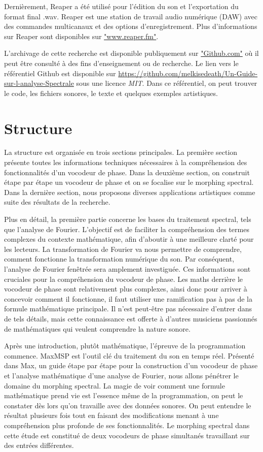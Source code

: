 Dernièrement, Reaper a été utilisé pour l'édition du son et l'exportation du format final .wav. Reaper est une station de travail audio numérique (DAW) avec des commandes multicanaux et des options d'enregistrement. Plus d’informations sur Reaper sont disponibles sur \href{https://www.reaper.fm/}{"www.reaper.fm"}.

L'archivage de cette recherche est disponible publiquement sur \href{https://github.com/}{"Github.com"} où il peut être consulté à des fins d'enseignement ou de recherche. Le lien vers le référentiel Github est disponible sur \href{https://github.com/melkisedeath/Un-Guide-sur-l-analyse-Spectrale}{https://github.com/melkisedeath/Un-Guide- sur-l-analyse-Spectrale} sous une licence \textit{MIT}. Dans ce référentiel, on peut trouver le code, les fichiers sonores, le texte et quelques exemples artistiques.

\section{Structure}

La structure est organisée en trois sections principales. La première section présente toutes les informations techniques nécessaires à la compréhension des fonctionnalités d'un vocodeur de phase. Dans la deuxième section, on construit étape par étape un vocodeur de phase et on se focalise sur le morphing spectral. Dans la dernière section, nous proposons diverses applications artistiques comme suite des résultats de la recherche.

Plus en détail, la première partie concerne les bases du traitement spectral, tels que l'analyse de Fourier. L’objectif est de faciliter la compréhension des termes complexes du contexte mathématique, afin d’aboutir à une meilleure clarté pour les lecteurs. La transformation de Fourier va nous permettre de comprendre, comment fonctionne la transformation numérique du son. Par conséquent, l'analyse de Fourier fenêtrée sera amplement investiguée. Ces informations sont cruciales pour la compréhension du vocodeur de phase. Les maths derrière le vocodeur de phase sont relativement plus complexes, ainsi donc pour arriver à concevoir comment il fonctionne, il faut utiliser une ramification pas à pas de la formule mathématique principale. Il n'est peut-être pas nécessaire d'entrer dans de tels détails, mais cette connaissance est offerte à d'autres musiciens passionnés de mathématiques qui veulent comprendre la nature sonore.

Après une introduction, plutôt mathématique, l'épreuve de la programmation commence. MaxMSP est l'outil clé du traitement du son en temps réel. Présenté dans Max, un guide étape par étape pour la construction d’un vocodeur de phase et l’analyse mathématique d’une analyse de Fourier, nous allons pénétrer le domaine du morphing spectral. La magie de voir comment une formule mathématique prend vie est l'essence même de la programmation, on peut le constater dès lors qu’on travaille avec des données sonores. On peut entendre le résultat plusieurs fois tout en faisant des modifications menant à une compréhension plus profonde de ses fonctionnalités. Le morphing spectral dans cette étude est constitué de deux vocodeurs de phase simultanés travaillant sur des entrées différentes.

